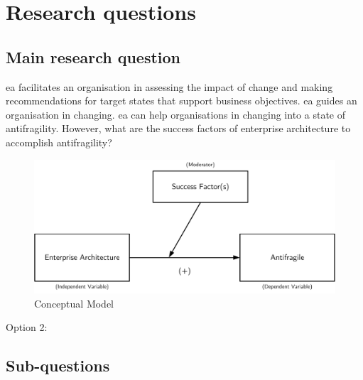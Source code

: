 \section{Research questions}
\label{sec:research-questions}

\subsection{Main research question}
\label{sub:main-research-question}
\acrshort{ea} facilitates an organisation in assessing the impact of change and making recommendations for target states that support business objectives. \acrshort{ea} guides an organisation in changing. \acrshort{ea} can help organisations in changing into a state of \gls{antifragility}. However, what are the success factors of enterprise architecture to accomplish \gls{antifragility}?
\begin{figure}[!h]
	\centering
	\includegraphics[width=0.7\linewidth]{images/conceptualmodel}
	\caption[Conceptual Model]{Conceptual Model}
	\label{fig:conceptualmodel}
\end{figure}
\begin{center}
\end{center}
Option 2:
\begin{center}
\end{center}

\subsection{Sub-questions}
\label{sub:sub-questions}

